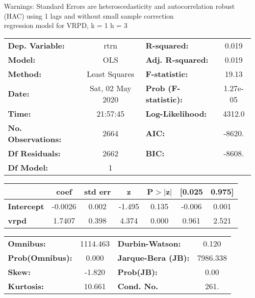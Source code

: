 Warnings: \newline
 [1] Standard Errors are heteroscedasticity and autocorrelation robust (HAC) using 1 lags and without small sample correction\\ 

regression model for VRPD, k = 1 h = 3\begin{center}
\begin{tabular}{lclc}
\toprule
\textbf{Dep. Variable:}    &       rtrn       & \textbf{  R-squared:         } &     0.019   \\
\textbf{Model:}            &       OLS        & \textbf{  Adj. R-squared:    } &     0.019   \\
\textbf{Method:}           &  Least Squares   & \textbf{  F-statistic:       } &     19.13   \\
\textbf{Date:}             & Sat, 02 May 2020 & \textbf{  Prob (F-statistic):} &  1.27e-05   \\
\textbf{Time:}             &     21:57:45     & \textbf{  Log-Likelihood:    } &    4312.0   \\
\textbf{No. Observations:} &        2664      & \textbf{  AIC:               } &    -8620.   \\
\textbf{Df Residuals:}     &        2662      & \textbf{  BIC:               } &    -8608.   \\
\textbf{Df Model:}         &           1      & \textbf{                     } &             \\
\bottomrule
\end{tabular}
\begin{tabular}{lcccccc}
                   & \textbf{coef} & \textbf{std err} & \textbf{z} & \textbf{P$> |$z$|$} & \textbf{[0.025} & \textbf{0.975]}  \\
\midrule
\textbf{Intercept} &      -0.0026  &        0.002     &    -1.495  &         0.135        &       -0.006    &        0.001     \\
\textbf{vrpd}      &       1.7407  &        0.398     &     4.374  &         0.000        &        0.961    &        2.521     \\
\bottomrule
\end{tabular}
\begin{tabular}{lclc}
\textbf{Omnibus:}       & 1114.463 & \textbf{  Durbin-Watson:     } &    0.120  \\
\textbf{Prob(Omnibus):} &   0.000  & \textbf{  Jarque-Bera (JB):  } & 7986.338  \\
\textbf{Skew:}          &  -1.820  & \textbf{  Prob(JB):          } &     0.00  \\
\textbf{Kurtosis:}      &  10.661  & \textbf{  Cond. No.          } &     261.  \\
\bottomrule
\end{tabular}
\end{center}

